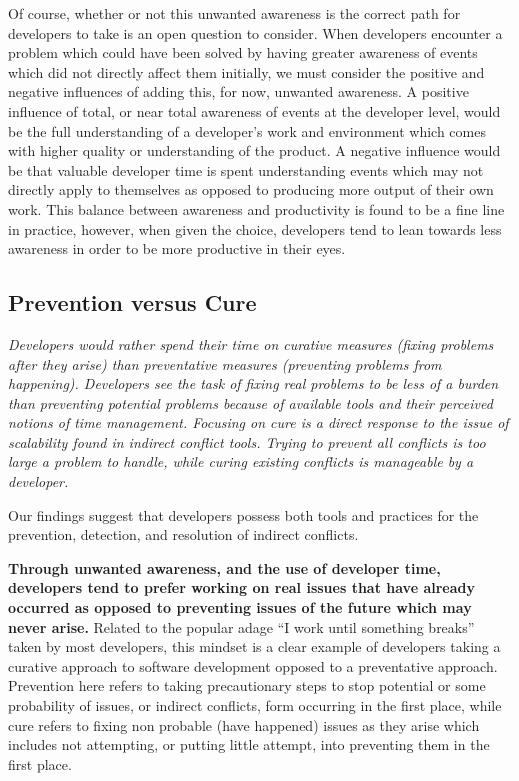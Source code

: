 \documentclass[conference]{IEEEtran}
\begin{document}
Of course, whether or not this unwanted awareness is the correct path for developers to take is an open question to consider. When
developers encounter a problem which could have been solved by having greater awareness of events which did not directly affect
them initially, we must consider the positive and negative influences of adding this, for now, unwanted awareness. A positive
influence of total, or near total
awareness of events at the developer level, would be the full understanding of a developer's work and environment which comes
with higher quality or understanding of the product.
A negative influence would be that valuable developer time is spent understanding events which may not directly apply to themselves as opposed to
producing more output of their own work. This balance between awareness and productivity is found to be a fine line in practice,
however, when given the choice, developers tend to lean towards less awareness in order to be more productive in their eyes.

\subsection{Prevention versus Cure}

\textit{Developers would rather spend their time on curative measures (fixing problems after they
arise) than preventative measures (preventing problems from happening). Developers see the task of fixing real problems
to be less of a burden than preventing potential problems because of available tools and their perceived notions of time management.
Focusing on cure is a direct response to the issue of scalability found in indirect conflict tools. Trying to prevent all conflicts
is too large a problem to handle, while curing existing conflicts is manageable by a developer.}

Our findings suggest that developers possess both tools and practices for the prevention,
detection, and resolution of indirect conflicts.

\textbf{Through unwanted awareness, and the use of developer time,
				developers tend to prefer working on real issues that have already occurred as opposed to preventing issues of the future which
				may never arise.} Related to the popular adage ``I work until something breaks'' taken by most developers, this mindset
is a clear example of developers taking a curative approach to software development opposed to a preventative approach.
Prevention here refers to taking precautionary steps to stop potential or some probability of issues, or indirect conflicts, form occurring in the first
place, while cure refers to fixing non probable (have happened) issues as they arise which includes not attempting, or putting little attempt, into preventing
them in the first place.
\end{document}
